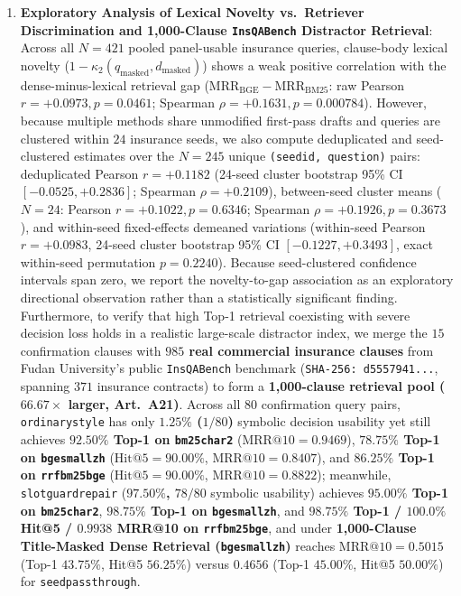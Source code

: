 \documentclass[10pt,twocolumn]{article}
\renewcommand{\_}{\textunderscore\allowbreak}
\begin{document}
\begin{enumerate}[leftmargin=*,nosep]
  \item \textbf{Exploratory Analysis of Lexical Novelty vs.\ Retriever Discrimination and 1,000-Clause \texttt{InsQABench} Distractor Retrieval}: Across all $N=421$ pooled panel-usable insurance queries, clause-body lexical novelty ($1-\kappa_2(q_{\text{masked}}, d_{\text{masked}})$) shows a weak positive correlation with the dense-minus-lexical retrieval gap ($\text{MRR}_{\text{BGE}} - \text{MRR}_{\text{BM25}}$: raw Pearson $r = +0.0973, p = 0.0461$; Spearman $\rho = +0.1631, p = 0.000784$). However, because multiple methods share unmodified first-pass drafts and queries are clustered within $24$ insurance seeds, we also compute deduplicated and seed-clustered estimates over the $N=245$ unique \texttt{(seed\_id, question)} pairs: deduplicated Pearson $r = +0.1182$ (24-seed cluster bootstrap 95\% CI $[-0.0525, +0.2836]$; Spearman $\rho = +0.2109$), between-seed cluster means ($N=24$: Pearson $r = +0.1022, p = 0.6346$; Spearman $\rho = +0.1926, p = 0.3673$), and within-seed fixed-effects demeaned variations (within-seed Pearson $r = +0.0983$, 24-seed cluster bootstrap 95\% CI $[-0.1227, +0.3493]$, exact within-seed permutation $p = 0.2240$). Because seed-clustered confidence intervals span zero, we report the novelty-to-gap association as an exploratory directional observation rather than a statistically significant finding. Furthermore, to verify that high Top-1 retrieval coexisting with severe decision loss holds in a realistic large-scale distractor index, we merge the $15$ confirmation clauses with \textbf{$985$ real commercial insurance clauses} from Fudan University's public \texttt{InsQABench} benchmark (\texttt{SHA-256: d5557941...}, spanning $371$ insurance contracts) to form a \textbf{1,000-clause retrieval pool ($66.67\times$ larger, Art.~A21)}. Across all $80$ confirmation query pairs, \texttt{ordinary\_style} has only \textbf{$1.25\%$ ($1/80$)} symbolic decision usability yet still achieves \textbf{$92.50\%$ Top-1 on \texttt{bm25\_char2}} ($\text{MRR@10} = 0.9469$), \textbf{$78.75\%$ Top-1 on \texttt{bge\_small\_zh}} ($\text{Hit@5} = 90.00\%$, $\text{MRR@10} = 0.8407$), and \textbf{$86.25\%$ Top-1 on \texttt{rrf\_bm25\_bge}} ($\text{Hit@5} = 90.00\%$, $\text{MRR@10} = 0.8822$); meanwhile, \texttt{slot\_guard\_repair} (\textbf{$97.50\%$, $78/80$} symbolic usability) achieves \textbf{$95.00\%$ Top-1 on \texttt{bm25\_char2}}, \textbf{$98.75\%$ Top-1 on \texttt{bge\_small\_zh}}, and \textbf{$98.75\%$ Top-1 / $100.0\%$ Hit@5 / $0.9938$ MRR@10 on \texttt{rrf\_bm25\_bge}}, and under \textbf{1,000-Clause Title-Masked Dense Retrieval (\texttt{bge\_small\_zh})} reaches $\text{MRR@10} = 0.5015$ (Top-1 $43.75\%$, Hit@5 $56.25\%$) versus $0.4656$ (Top-1 $45.00\%$, Hit@5 $50.00\%$) for \texttt{seed\_passthrough}.
\end{enumerate}
\end{document}
